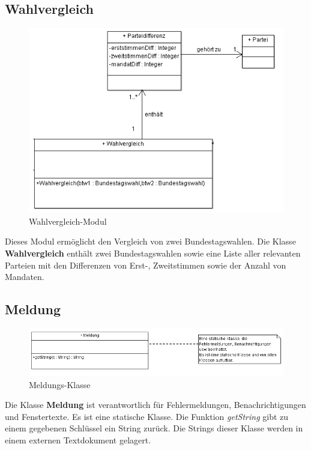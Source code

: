 \documentclass[12pt,a4paper,titlepage]{article}
\newcommand{\myma}{\fontfamily{pcr}\selectfont \textbf}
\newcommand{\mymo}{\fontfamily{pcr}\selectfont \textit}
\begin{document}
\subsection{Wahlvergleich}
\begin{figure}[!ht]
\centering
\includegraphics[scale=0.8]{Klassendiagramme/Wahlvergleich.png} \caption{Wahlvergleich-Modul} 
\end{figure}

Dieses Modul ermöglicht den Vergleich von zwei Bundestagswahlen.
Die Klasse {\myma{Wahlvergleich}} enthält zwei Bundestagswahlen sowie eine Liste aller relevanten Parteien mit den Differenzen von Erst-, Zweitstimmen sowie der Anzahl von Mandaten.

\newpage
\subsection{Meldung}
\begin{figure}[!ht]
\centering
\includegraphics[scale=0.8]{Meldung_Ausschnitt.png} \caption{Meldungs-Klasse} 
\end{figure}
Die Klasse {\myma{Meldung}} ist verantwortlich für Fehlermeldungen, Benachrichtigungen und Fenstertexte. Es ist eine statische Klasse. Die Funktion {\mymo{getString}} gibt zu einem gegebenen Schlüssel ein String zurück. Die Strings dieser Klasse werden in einem externen Textdokument gelagert.
\end{document}
